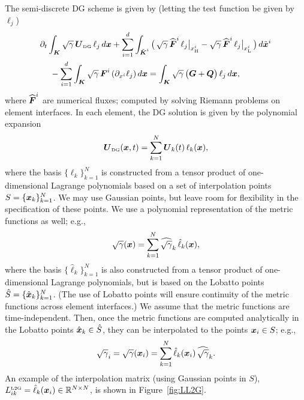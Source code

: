 \documentclass[10pt,preprint]{aastex}
\begin{document}
The semi-discrete DG scheme is given by (letting the test function be given by $\ell_{j}$)
\begin{align}
  &\pd{}{t}\int_{\bK}\sqrt{\gamma}\,\bU_{\DG}\,\ell_{j}\,d\bx
  +\sum_{i=1}^{d}\int_{\tilde{\bK}^{i}}
  \big(\,
    \sqrt{\gamma}\,\widehat{\bF}^{i}\,\ell_{j}\big|_{x_{\Hgh}^{i}}
    -\sqrt{\gamma}\,\widehat{\bF}^{i}\,\ell_{j}\big|_{x_{\Low}^{i}}
  \,\big)\,d\tilde{\bx}^{i} \nonumber \\
  &\hspace{12pt}
  -\sum_{i=1}^{d}\int_{\bK}\sqrt{\gamma}\,\bF^{i}\,(\pd{\ell_{j}}{x^{i}})\,d\bx
  =\int_{\bK}\sqrt{\gamma}\,\big(\bG+\bQ\big)\,\ell_{j}\,d\bx,
  \label{eq:dgSemiDiscrete}
\end{align}
where $\widehat{\boldsymbol{F}}^{i}$ are numerical fluxes; computed by solving Riemann problems on element interfaces.  
In each element, the DG solution is given by the polynomial expansion
\begin{equation}
  \boldsymbol{U}_{\mbox{\tiny DG}}(\boldsymbol{x},t)=\sum_{k=1}^{N}\boldsymbol{U}_{k}(t)\,\ell_{k}(\boldsymbol{x}), 
\end{equation}
where the basis $\big\{\ell_{k}\big\}_{k=1}^{N}$ is constructed from a tensor product of one-dimensional Lagrange polynomials based on a set of interpolation points $S=\{\boldsymbol{x}_{k}\}_{k=1}^{N}$.  
We may use Gaussian points, but leave room for flexibility in the specification of these points.  
We use a polynomial representation of the metric functions as well; e.g.,
\begin{equation}
  \sqrt{\gamma}(\boldsymbol{x})=\sum_{k=1}^{N}\widehat{\sqrt{\gamma}}_{k}\,\hat{\ell}_{k}(\boldsymbol{x}),
\end{equation}
where the basis $\big\{\hat{\ell}_{k}\big\}_{k=1}^{N}$ is also constructed from a tensor product of one-dimensional Lagrange polynomials, but is based on the Lobatto points $\hat{S}=\{\hat{\boldsymbol{x}}_{k}\}_{k=1}^{N}$.  
(The use of Lobatto points will ensure continuity of the metric functions across element interfaces.)  
We assume that the metric functions are time-independent.  
Then, once the metric functions are computed analytically in the Lobatto points $\hat{\boldsymbol{x}}_{k}\in\hat{S}$, they can be interpolated to the points $\boldsymbol{x}_{i}\in S$; e.g.,
\begin{equation}
  \sqrt{\gamma}_{i}=\sqrt{\gamma}(\bx_{i})
  =\sum_{k=1}^{N}\hat{\ell}_{k}(\bx_{i})\,\widehat{\sqrt{\gamma}}_{k}.  
  \label{eq:l2g}
\end{equation}
An example of the interpolation matrix (using Gaussian points in $S$), $L_{ik}^{\mbox{\tiny L2G}}=\hat{\ell}_{k}(\boldsymbol{x}_{i})\in\mathbb{R}^{N\times N}$, is shown in Figure~\ref{fig:LL2G}.  
\end{document}
